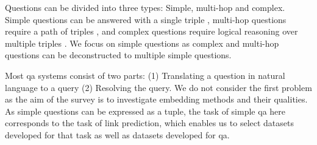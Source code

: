 Questions can be divided into three types: Simple, multi-hop and complex.
Simple questions can be answered with a single triple \cite{bordes2015simple}, multi-hop questions require a path of triples \cite{zhang2017multihop}, and complex questions require logical reasoning over multiple triples \cite{talmorberant2018decomposition}.
We focus on simple questions as complex and multi-hop questions can be deconstructed to multiple simple questions. \cite{yani2021}

Most \gls{qa} systems consist of two parts: (1) Translating a question in natural language to a query (2) Resolving the query.
We do not consider the first problem as the aim of the survey is to investigate embedding methods and their qualities.
As simple questions can be expressed as a tuple, the task of simple \gls{qa} here corresponds to the task of link prediction, which enables us to select datasets developed for that task as well as datasets developed for \gls{qa}.